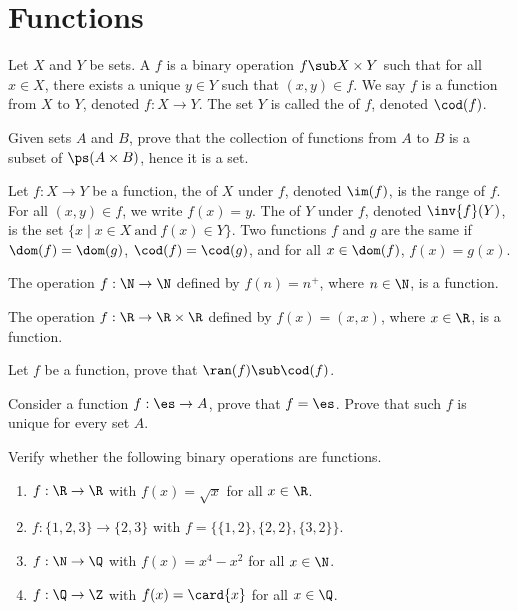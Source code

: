 \documentclass[10pt]{article}
\begin{document}
\section{Functions}
\begin{definition}
    Let $X$ and $Y$ be sets. A  $f$ is a binary operation $f\sub X\times Y$ such that for all $x\in X$, there exists a unique $y\in Y$ such that $(x,y)\in f$. We say $f$ is a function from $X$ to $Y$, denoted $f:X\to Y$. The set $Y$ is called the  of $f$, denoted $\cod(f)$.
\end{definition}
\begin{problem}
    Given sets $A$ and $B$, prove that the collection of functions from $A$ to $B$ is a subset of $\ps(A\times B)$, hence it is a set.
\end{problem}
\begin{definition}
    Let $f:X\to Y$ be a function, the  of $X$ under $f$, denoted $\im(f)$, is the range of $f$. For all $(x,y)\in f$, we write $f(x)=y$. The  of $Y$ under $f$, denoted $\inv{f}(Y)$, is the set $\{x\mid x\in X\ \text{and}\ f(x)\in Y\}$. Two functions $f$ and $g$ are the same if $\dom(f)=\dom(g)$, $\cod(f)=\cod(g)$, and for all $x\in\dom(f)$, $f(x)=g(x)$.
\end{definition}
\begin{example}
    The operation $f:\N\to\N$ defined by $f(n)={n}^{+}$, where $n\in\N$, is a function.
\end{example}
\begin{example}
    The operation $f:\R\to\R\times\R$ defined by $f(x)=(x,x)$, where $x\in\R$, is a function.
\end{example}
\begin{problem}
    Let $f$ be a function, prove that $\ran(f)\sub\cod(f)$.
\end{problem}
\begin{problem}
    Consider a function $f:\es\to A$, prove that $f=\es$. Prove that such $f$ is unique for every set $A$.
\end{problem}
\begin{problem}
    Verify whether the following binary operations are functions.
    \begin{enumerate}
        \item $f:\R\to\R$ with $f(x)=\sqrt{x}$ for all $x\in\R$.
        \item $f:\{1,2,3\}\to\{2,3\}$ with $f=\{\{1,2\},\{2,2\},\{3,2\}\}$.
        \item $f:\N\to\Q$ with $f(x)={x}^{4}-{x}^{2}$ for all $x\in\N$.
        \item $f:\Q\to\Z$ with $f(x)=\card{x}$ for all $x\in\Q$.
    \end{enumerate}
\end{problem}
\end{document}
